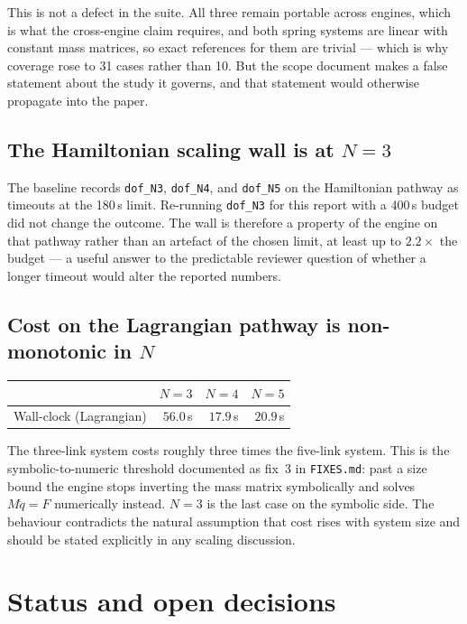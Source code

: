 \documentclass[11pt,a4paper]{article}
\begin{document}
This is not a defect in the suite. All three remain portable across engines,
which is what the cross-engine claim requires, and both spring systems are
linear with constant mass matrices, so exact references for them are trivial
--- which is why coverage rose to 31 cases rather than 10. But the scope
document makes a false statement about the study it governs, and that statement
would otherwise propagate into the paper.

\subsection{The Hamiltonian scaling wall is at $N = 3$}\label{sec:wall}

The baseline records \texttt{dof\_N3}, \texttt{dof\_N4}, and \texttt{dof\_N5}
on the Hamiltonian pathway as timeouts at the 180\,s limit. Re-running
\texttt{dof\_N3} for this report with a 400\,s budget did not change the
outcome. The wall is therefore a property of the engine on that pathway rather
than an artefact of the chosen limit, at least up to $2.2\times$ the budget ---
a useful answer to the predictable reviewer question of whether a longer
timeout would alter the reported numbers.

\subsection{Cost on the Lagrangian pathway is non-monotonic in $N$}

\begin{center}
\begin{tabular}{@{}lrrr@{}}
\toprule
& $N=3$ & $N=4$ & $N=5$ \\
\midrule
Wall-clock (Lagrangian) & $56.0$\,s & $17.9$\,s & $20.9$\,s \\
\bottomrule
\end{tabular}
\end{center}

The three-link system costs roughly three times the five-link system. This is
the symbolic-to-numeric threshold documented as fix~3 in \texttt{FIXES.md}:
past a size bound the engine stops inverting the mass matrix symbolically and
solves $M\ddot q = F$ numerically instead. $N=3$ is the last case on the
symbolic side. The behaviour contradicts the natural assumption that cost rises
with system size and should be stated explicitly in any scaling discussion.

\section{Status and open decisions}
\end{document}
